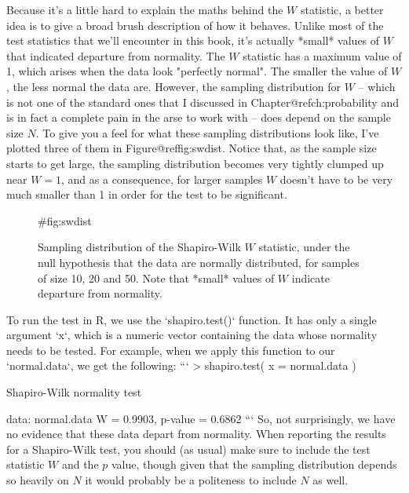 Because it's a little hard to explain the maths behind the $W$ statistic, a better idea is to give a broad brush description of how it behaves. Unlike most of the test statistics that we'll encounter in this book, it's actually *small* values of $W$ that indicated departure from normality. The $W$ statistic has a maximum value of 1, which arises when the data look "perfectly normal". The smaller the value of $W$, the less normal the data are. However, the sampling distribution for $W$  -- which is not one of the standard ones that I discussed in Chapter@refch:probability and is in fact a complete pain in the arse to work with -- does depend on the sample size $N$. To give you a feel for what these sampling distributions look like, I've plotted three of them in Figure@reffig:swdist. Notice that, as the sample size starts to get large, the sampling distribution becomes very tightly clumped up near $W=1$, and as a consequence, for larger samples $W$ doesn't have to be very much smaller than 1 in order for the test to be significant. 

\begin{figure}
\begin{center}
\caption{Sampling distribution of the Shapiro-Wilk $W$ statistic, under the null hypothesis that the data are normally distributed, for samples of size 10, 20 and 50. Note that *small* values of $W$ indicate departure from normality.}
\HR
{#fig:swdist}
\end{center}
\end{figure}

To run the test in R, we use the `shapiro.test()` function. It has only a single argument `x`, which is a numeric vector containing the data whose normality needs to be tested. For example, when we apply this function to  our `normal.data`, we get the following:
```
> shapiro.test( x = normal.data )

	Shapiro-Wilk normality test

data:  normal.data 
W = 0.9903, p-value = 0.6862
```
So, not surprisingly, we have no evidence that these data depart from normality. When reporting the results for a Shapiro-Wilk test, you should (as usual) make sure to include the test statistic $W$ and the $p$ value, though given that the sampling distribution depends so heavily on $N$ it would probably be a politeness to include $N$ as well.



